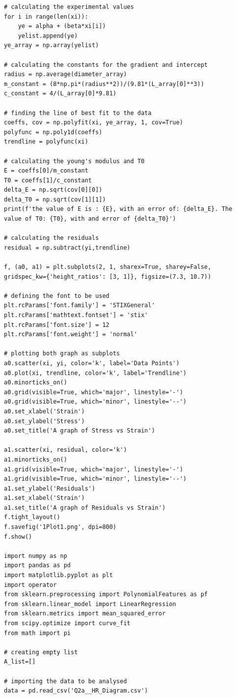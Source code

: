 \documentclass[12pt, a4paper]{article}
\begin{document}
\begin{verbatim}
# calculating the experimental values 
for i in range(len(xi)):
    ye = alpha + (beta*xi[i])
    yelist.append(ye)
ye_array = np.array(yelist)

# calculating the constants for the gradient and intercept
radius = np.average(diameter_array)
m_constant = (8*np.pi*(radius**2))/(9.81*(L_array[0]**3))
c_constant = 4/(L_array[0]*9.81)

# finding the line of best fit to the data
coeffs, cov = np.polyfit(xi, ye_array, 1, cov=True)
polyfunc = np.poly1d(coeffs)
trendline = polyfunc(xi)

# calculating the young's modulus and T0
E = coeffs[0]/m_constant
T0 = coeffs[1]/c_constant
delta_E = np.sqrt(cov[0][0])
delta_T0 = np.sqrt(cov[1][1])
print(f'the value of E is : {E}, with an error of: {delta_E}. The value of T0: {T0}, with and error of {delta_T0}')

# calculating the residuals
residual = np.subtract(yi,trendline)

f, (a0, a1) = plt.subplots(2, 1, sharex=True, sharey=False, gridspec_kw={'height_ratios': [3, 1]}, figsize=(7.3, 10.7))

# defining the font to be used
plt.rcParams['font.family'] = 'STIXGeneral'
plt.rcParams['mathtext.fontset'] = 'stix'
plt.rcParams['font.size'] = 12
plt.rcParams['font.weight'] = 'normal'

# plotting both graph as subplots
a0.scatter(xi, yi, color='k', label='Data Points')
a0.plot(xi, trendline, color='k', label='Trendline')
a0.minorticks_on()
a0.grid(visible=True, which='major', linestyle='-')
a0.grid(visible=True, which='minor', linestyle='--')
a0.set_xlabel('Strain')
a0.set_ylabel('Stress')
a0.set_title('A graph of Stress vs Strain')

a1.scatter(xi, residual, color='k')
a1.minorticks_on()
a1.grid(visible=True, which='major', linestyle='-')
a1.grid(visible=True, which='minor', linestyle='--')
a1.set_ylabel('Residuals')
a1.set_xlabel('Strain')
a1.set_title('A graph of Residuals vs Strain')
f.tight_layout()
f.savefig('1Plot1.png', dpi=800)
f.show()

import numpy as np
import pandas as pd
import matplotlib.pyplot as plt
import operator
from sklearn.preprocessing import PolynomialFeatures as pf
from sklearn.linear_model import LinearRegression
from sklearn.metrics import mean_squared_error
from scipy.optimize import curve_fit
from math import pi

# creating empty list
A_list=[]

# importing the data to be analysed
data = pd.read_csv('Q2a__HR_Diagram.csv')


\end{verbatim}
\end{document}
